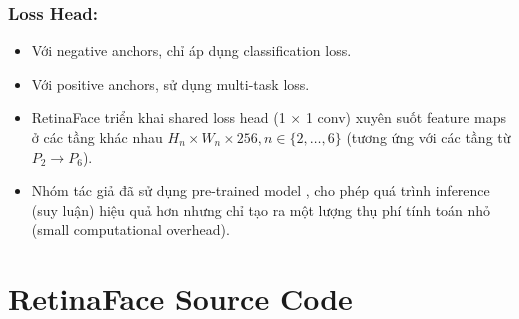 \documentclass[12pt, a4paper, oneside]{book}
\theoremstyle{plain}
\numberwithin{equation}{chapter} \DeclareMathOperator{\Var}{var}
\begin{document}
\subsection{Loss Head:}
\begin{itemize}
    \item[--] Với negative anchors, chỉ áp dụng classification loss.
    \item[--] Với positive anchors, sử dụng multi-task loss.  
    \item[--] RetinaFace triển khai shared loss head (1 \(\times\) 1 conv) xuyên suốt feature maps ở các tầng khác nhau \(H_n \times W_n \times 256, n \in \{2,\dots,6\}\) (tương ứng với các tầng từ \(P_2 \to P_6\)).
    \item[--] Nhóm tác giả đã sử dụng pre-trained model \cite{zhou2019dense}, cho phép quá trình inference (suy luận) hiệu quả hơn nhưng chỉ tạo ra một lượng thụ phí tính toán nhỏ (small computational overhead).
\end{itemize}


\chapter{RetinaFace Source Code}
\end{document}
